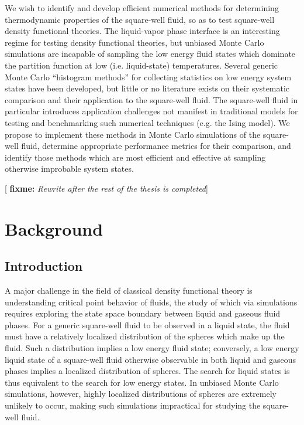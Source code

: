 \documentclass[11pt]{article}
\newcommand{\red}[1]{{\bf \color{red} #1}}
\newcommand{\fixme}[1]{[\red{fixme:} \emph{#1}]}
\begin{document}
\thispagestyle{abstract}

We wish to identify and develop efficient numerical methods for
determining thermodynamic properties of the square-well fluid, so as
to test square-well density functional theories. The liquid-vapor
phase interface is an interesting regime for testing density
functional theories, but unbiased Monte Carlo simulations are
incapable of sampling the low energy fluid states which dominate the
partition function at low (i.e. liquid-state) temperatures. Several
generic Monte Carlo ``histogram methods'' for collecting statistics on
low energy system states have been developed, but little or no
literature exists on their systematic comparison and their application
to the square-well fluid. The square-well fluid in particular
introduces application challenges not manifest in traditional models
for testing and benchmarking such numerical techniques (e.g. the Ising
model). We propose to implement these methods in Monte Carlo
simulations of the square-well fluid, determine appropriate
performance metrics for their comparison, and identify those methods
which are most efficient and effective at sampling otherwise
improbable system states.

\fixme{Rewrite after the rest of the thesis is completed}

\newpage


\section{Background}
\label{sec:background}

\subsection{Introduction}
\label{sec:intro}

A major challenge in the field of classical density functional theory
is understanding critical point behavior of fluids, the study of which
via simulations requires exploring the state space boundary between
liquid and gaseous fluid phases. For a generic square-well fluid to be
observed in a liquid state, the fluid must have a relatively localized
distribution of the spheres which make up the fluid. Such a
distribution implies a low energy fluid state; conversely, a low
energy liquid state of a square-well fluid otherwise observable in
both liquid and gaseous phases implies a localized distribution of
spheres. The search for liquid states is thus equivalent to the search
for low energy states. In unbiased Monte Carlo simulations, however,
highly localized distributions of spheres are extremely unlikely to
occur, making such simulations impractical for studying the
square-well fluid.
\end{document}
